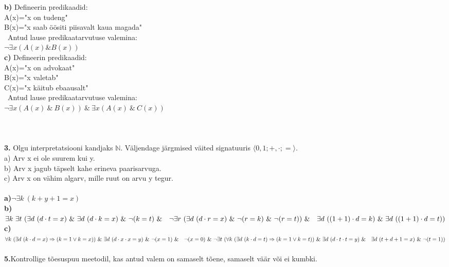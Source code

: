 \documentclass[fullpage]{article}
\begin{document}
\textbf{b)} Defineerin predikaadid:\\
\null\quad\quad A(x)="x on tudeng"\\
\null\quad\quad B(x)="x saab \"o\"ositi piisavalt kaua magada"\\
\null\quad\ Antud lause predikaatarvutuse valemina:\\
\null\quad\quad $\neg\exists x(A(x)\&B(x))$\\
\textbf{c)} Defineerin predikaadid:\\
\null\quad\quad A(x)="x on advokaat"\\
\null\quad\quad B(x)="x valetab"\\
\null\quad\quad C(x)="x k\"aitub ebaausalt"\\
\null\quad\ Antud lause predikaatarvutuse valemina:\\
\null\quad\quad $\neg\exists x(A(x)\ \&\ B(x))\ \&\ \exists x(A(x)\ \&\ C(x))$\\\\\\\\
\textbf{3.} Olgu interpretatsiooni kandjaks $\mathbb{N}$. V\"aljendage j\"argmised v\"aited signatuuris $\langle0,1;+,\cdot;=\rangle$.\\
a) Arv x ei ole suurem kui y.\\
b) Arv x jagub t\"apselt kahe erineva paarisarvuga.\\
c) Arv x on v\"ahim algarv, mille ruut on arvu y tegur.\\\\
\textbf{a)}$\neg\exists k\ (k+y+1=x)$\\
\textbf{b)}$\exists k\ \exists t\ (\exists d\ (d\cdot t=x)\ \&\ \exists d\ (d\cdot k=x)\ \&\ \neg(k=t)\ \&\\ \null\quad \neg\exists r\ (\exists d\ (d\cdot r=x)\ \&\ \neg(r=k)\ \&\ \neg(r=t))\ \&\\\null\quad \exists d\ ((1+1)\cdot d=k)\ \&\ \exists d\ ((1+1)\cdot d=t))$\\
\textbf{c)}$\forall k\ (\exists d\ (k\cdot d=x)\Rightarrow (k=1\vee k=x))\ \&\ \exists d\ (d\cdot x\cdot x=y)\ \&\ \neg(x=1)\ \&\\\null\quad \neg(x=0)\ \&\ \neg\exists t\ (\forall k\ (\exists d\ (k\cdot d=t)\Rightarrow (k=1\vee k=t))\ \&\ \exists d\ (d\cdot t\cdot t=y)\ \&\\\null\quad \exists d\ (t+d+1=x)\ \&\ \neg(t=1))$\\\\
\textbf{5.}Kontrollige t\~oesuspuu meetodil, kas antud valem on samaselt t\~oene, samaselt v\"a\"ar v\~oi ei kumbki.\\\\
\end{document}
